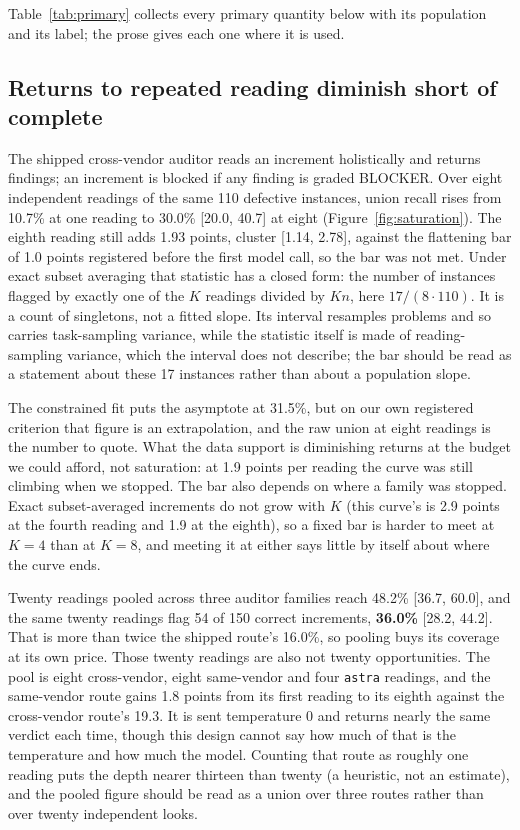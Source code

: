 

Table~\ref{tab:primary} collects every primary quantity below with its population and its label;
the prose gives each one where it is used.

\subsection{Returns to repeated reading diminish short of complete}
\label{sec:repeat}

The shipped cross-vendor auditor reads an increment holistically and returns findings; an
increment is blocked if any finding is graded BLOCKER. Over eight independent readings of the same
110 defective instances, union recall rises from 10.7\% at one reading to 30.0\% [20.0, 40.7] at
eight (Figure~\ref{fig:saturation}). The eighth reading still adds 1.93 points, cluster [1.14,
2.78], against the flattening bar of 1.0 points registered before the first model call, so the bar
was not met. Under exact subset averaging that statistic has a closed form: the number of
instances flagged by exactly one of the $K$ readings divided by $K n$, here $17/(8\cdot110)$. It
is a count of singletons, not a fitted slope. Its interval resamples problems and so carries
task-sampling variance, while the statistic itself is made of reading-sampling variance, which the
interval does not describe; the bar should be read as a statement about these 17 instances rather
than about a population slope.

The constrained fit puts the asymptote at 31.5\%, but on our own registered criterion that figure
is an extrapolation, and the raw union at eight readings is the number to quote. What the data
support is diminishing returns at the budget we could afford, not saturation: at 1.9 points per
reading the curve was still climbing when we stopped. The bar also depends on where a family was
stopped. Exact subset-averaged increments do not grow with $K$ (this curve's is 2.9 points at the
fourth reading and 1.9 at the eighth), so a fixed bar is harder to meet at $K = 4$ than at
$K = 8$, and meeting it at either says little by itself about where the curve ends.

Twenty readings pooled across three auditor families reach 48.2\% [36.7, 60.0], and the same
twenty readings flag 54 of 150 correct increments, \textbf{36.0\%} [28.2, 44.2]. That is more than
twice the shipped route's 16.0\%, so pooling buys its coverage at its own price. Those twenty
readings are also not twenty opportunities. The pool is eight cross-vendor, eight same-vendor and
four \texttt{astra} readings, and the same-vendor route gains 1.8 points from its first reading to
its eighth against the cross-vendor route's 19.3. It is sent temperature $0$ and returns nearly the
same verdict each time, though this design cannot say how much of that is the temperature and how
much the model. Counting that route as roughly one reading puts the depth nearer thirteen than
twenty (a heuristic, not an estimate), and the pooled figure should be read as a union over three
routes rather than over twenty independent looks.

